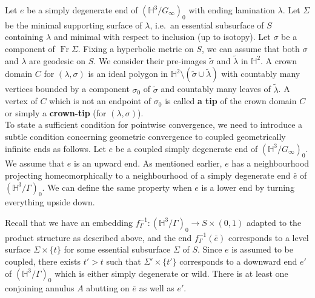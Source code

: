 \documentclass{amsart}
\theoremstyle{definition}
\newcommand{\hyperbolic}{\mathbb{H}}
\newcommand{\Fr}{\operatorname{Fr}}
\newcommand\HHH{{\mathbb H}}
\begin{document}
Let $e$ be a simply degenerate end of $(\HHH^3/G_\infty)_0$ with ending lamination $\lambda$.
Let $\Sigma$ be the minimal supporting surface of $\lambda$,  i.e.\ an essential subsurface of $S$ containing $\lambda$ and minimal with respect to  inclusion (up to isotopy).
Let $\sigma$ be a component of $\Fr \Sigma$.
Fixing a hyperbolic metric on $S$, we can assume that both $\sigma$ and $\lambda$ are geodesic on $S$.
We consider  their pre-images $\tilde \sigma$ and $\tilde \lambda$ in $\HHH^2$.
A crown domain $C$ for $(\lambda, \sigma)$ is an ideal polygon in $\HHH^2 \setminus (\tilde \sigma \cup \tilde \lambda)$ with countably many vertices bounded by a component $\sigma_0$ of $\tilde \sigma$ and countably many leaves of $\tilde \lambda$.
A vertex of $C$ which is not an endpoint of $\sigma_0$ is called  {\bf a tip} of the crown domain $C$ or simply a {\bf crown-tip} (for $(\lambda, \sigma)$).\\


To state a sufficient condition for pointwise convergence, we need to introduce a subtle condition concerning  geometric convergence to coupled geometrically infinite ends as follows.
Let $e$ be a coupled simply degenerate end of $(\HHH^3/G_\infty)_0$.
We  assume that $e$ is an upward end.
As mentioned earlier, $e$ has a neighbourhood  projecting homeomorphically to a neighbourhood of a simply degenerate end $\bar e$ of $(\HHH^3/\Gamma)_0$.
We can define the same property when $e$ is a lower end by turning everything upside down.

Recall that we have an embedding $f_\Gamma^{-1} \colon (\HHH^3/\Gamma)_0 \rightarrow S \times (0,1)$ adapted to the product structure as described above, and the end $f_\Gamma^{-1}(\bar e)$ corresponds to a level surface $\Sigma \times \{t\}$ for some essential  subsurface $\Sigma$ of $S$.
%
Since $e$ is assumed to be  coupled,  there exists $t' > t$ such that $\Sigma' \times \{t'\}$ corresponds to a downward end $e'$ of $(\hyperbolic^3/\Gamma)_0$ which is either simply degenerate or wild.
There is  at least one conjoining annulus $A$ abutting on  $\bar e$ as well as $e'$. 
\end{document}
